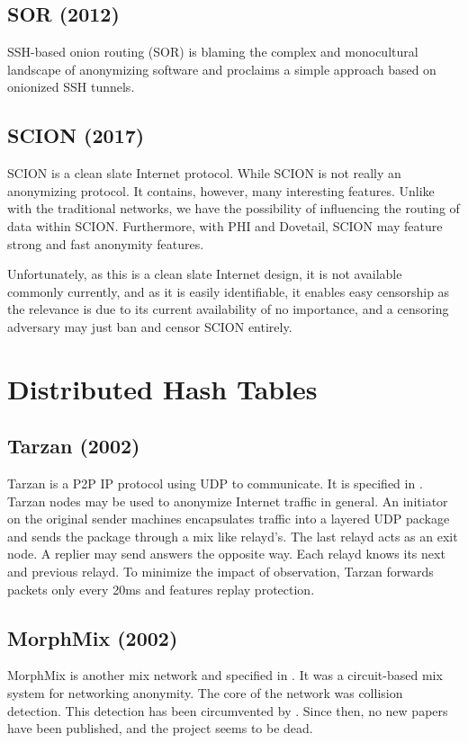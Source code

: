 \subsection{SOR (2012)}
SSH-based onion routing (SOR)\cite{Egners_2012} is blaming the complex and monocultural landscape of anonymizing software and proclaims a simple approach based on onionized SSH tunnels. 

\subsection{SCION (2017)}
SCION\cite{perrig2017scion} is a clean slate Internet protocol. While SCION is not really an anonymizing protocol. It contains, however,  many interesting features. Unlike with the traditional networks, we have the possibility of influencing the routing of data within SCION. Furthermore, with PHI\cite{chen2017phi} and Dovetail\cite{sankey2014dovetail}, SCION may feature strong and fast anonymity features. 

Unfortunately, as this is a clean slate Internet design, it is not available commonly currently, and as it is easily identifiable, it enables easy censorship as the relevance is due to its current availability of no importance, and a censoring adversary may just ban and censor SCION entirely. 

\section{Distributed Hash Tables}
\subsection{Tarzan (2002)}
Tarzan is a P2P IP protocol using UDP to communicate. It is specified in \cite{tarzan:ccs02}. Tarzan nodes may be used to anonymize Internet traffic in general. An initiator on the original sender machines encapsulates traffic into a layered UDP package and sends the package through a mix like relayd's. The last relayd acts as an exit node. A replier may send answers the opposite way. Each relayd knows its next and previous relayd. To minimize the impact of observation, Tarzan forwards packets only every 20ms and features replay protection.

\subsection{MorphMix (2002)}
MorphMix is another mix network and specified in \cite{morphmix:wpes2002}. It was a circuit-based mix system for networking anonymity. The core of the network was collision detection. This detection has been circumvented by \cite{morphmix:pet2006}. Since then, no new papers have been published, and the project seems to be dead.

